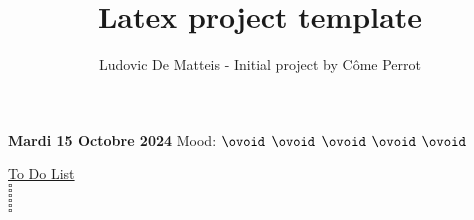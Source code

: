 \documentclass[11pt]{article}
\title{Latex project template}
\author{Ludovic De Matteis - Initial project by Côme Perrot}
\date{}
\begin{document}
\newcommand{\jumpsize}{0.45cm}
\newcommand{\dotspaces}{0.4cm}
    
\Huge{\bf{ Mardi 15 Octobre 2024}} \hfill \normalsize{Mood: $\ovoid$ $\ovoid$ $\ovoid$ $\ovoid$ $\ovoid$}\\
    
\vspace{0.3cm}
\begin{center}
    \huge{\underline{To Do List}}\\[0.5cm]
    $\square$ \dotfill\\[\dotspaces]
    $\square$ \dotfill\\[\dotspaces]
    $\square$ \dotfill\\[\dotspaces]
    $\square$ \dotfill\\[\dotspaces]
    $\square$ \dotfill\\[\dotspaces]
    $\square$ \dotfill\\[\dotspaces]
\end{center}
\end{document}
